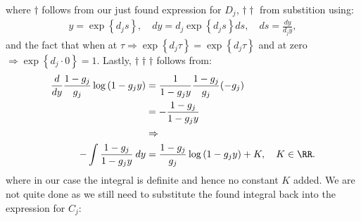 \documentclass[11pt]{article}
\numberwithin{equation}{section}
\begin{document}
where $\dagger$ follows from our just found expression for $D_j$,
$\dagger\dagger$ from substition using:
\begin{align*}
    y=\exp\left\{d_j s\right\}, \quad dy=d_j\exp\left\{d_j s\right\}ds,\quad ds=\frac{dy}{d_j y},
\end{align*}
and the fact that when at $\tau \Rightarrow \exp\left\{d_j \tau\right\}=\exp\left\{d_j \tau\right\}$ and at
zero $\Rightarrow \exp\left\{d_j \cdot 0 \right\}=1$. Lastly,
$\dagger\dagger\dagger$ follows from:
\begin{align*}
    \frac{d}{dy}\frac{1-g_j}{g_j}\log{(1-g_j y)}&=\frac{1}{1-g_jy}\frac{1-g_j}{g_j}(-g_j)\\
    &=-\frac{1-g_j}{1-g_jy}\\
    &\Rightarrow\\
    -\int\frac{1-g_j}{1-g_jy}\:dy&=\frac{1-g_j}{g_j}\log{(1-g_jy)}+K, \quad K\in \RR.
\end{align*}
where in our case the integral is definite and hence no constant $K$ added. We are not quite done as we still need to substitute the found integral back
into the expression for $C_j$:
\end{document}
